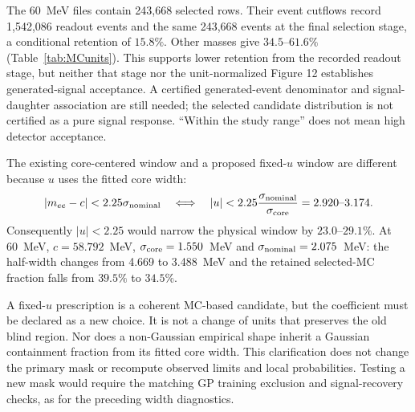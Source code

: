 The 60~MeV files contain 243,668 selected rows. Their event cutflows
record 1,542,086 readout events and the same 243,668 events at the final
selection stage, a conditional retention of $15.8\%$. Other masses
give $34.5$--$61.6\%$ (Table~\ref{tab:MCunits}). This supports lower
retention from the recorded readout stage, but neither that stage nor
the unit-normalized Figure 12 establishes generated-signal acceptance.
A certified generated-event denominator and signal-daughter association
are still needed; the selected candidate distribution is not certified
as a pure signal response. ``Within the study range'' does not mean
high detector acceptance.

The existing core-centered window and a proposed fixed-$u$ window are
different because $u$ uses the fitted core width:
\begin{equation}
 |m_{ee}-c|<2.25\sigma_{\rm nominal}
 \quad\Longleftrightarrow\quad
 |u|<2.25\frac{\sigma_{\rm nominal}}{\sigma_{\rm core}}
 =2.920\text{--}3.174.
\end{equation}
Consequently $|u|<2.25$ would narrow the physical window by
$23.0$--$29.1\%$. At 60~MeV, $c=58.792$~MeV,
$\sigma_{\rm core}=1.550$~MeV and $\sigma_{\rm nominal}=2.075$~MeV:
the half-width changes from 4.669 to 3.488~MeV and the retained
selected-MC fraction falls from $39.5\%$ to $34.5\%$.

\begin{table}[H]\centering\scriptsize

\caption{Widths in MeV and continuous-window probabilities from the
stored 0--400~MeV MC histograms. ``Old'' means the existing
core-centered $\pm2.25\sigma_{\rm nominal}$ window. The last column
is conditional readout-stage retention, not detector acceptance.
Actual observed-bin masks use bin centers and can differ slightly
from these continuous fractions.}\label{tab:MCunits}
\end{table}

A fixed-$u$ prescription is a coherent MC-based candidate, but the
coefficient must be declared as a new choice. It is not a change of
units that preserves the old blind region. Nor does a non-Gaussian
empirical shape inherit a Gaussian containment fraction from its fitted
core width. This clarification does not change the primary mask or
recompute observed limits and local probabilities. Testing a new mask
would require the matching GP training exclusion and signal-recovery
checks, as for the preceding width diagnostics.
